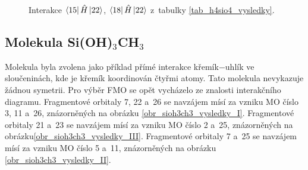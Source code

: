 \documentclass[
  printed, %
  table,   %
  lof,     %
  lot,     %
  oneside,
]{fithesis3}
\begin{document}
\begin{figure}
\begin{center}
\caption{Interakce $\bra{15}{\hat{H}}\ket{22}$, $\bra{18}{\hat{H}}\ket{22}$ z~tabulky \ref{tab_h4sio4_vysledky}.}
\label{obr_h4sio4_vysledky_III}
\end{center}
\end{figure} 
\subsection{Molekula Si(OH)$_3$CH$_3$}
Molekula  byla zvolena jako příklad přímé interakce křemík$-$uhlík ve sloučeninách, kde je křemík koordinován čtyřmi atomy. Tato molekula nevykazuje žádnou symetrii. Pro výběr FMO se opět vycházelo ze znalosti interakčního diagramu. 
Fragmentové orbitaly  7, 22 a~26 se navzájem mísí za vzniku MO číslo 3, 11 a~26, znázorněných na obrázku \ref{obr_sioh3ch3_vysledky_I}. Fragmentové orbitaly  21 a~23 se navzájem mísí za vzniku MO číslo 2 a~25, znázorněných na obrázku\ref{obr_sioh3ch3_vysledky_III}. 
Fragmentové orbitaly  7 a~25 se navzájem mísí za vzniku MO číslo 5 a~11, znázorněných na obrázku \ref{obr_sioh3ch3_vysledky_II}.    
\end{document}
